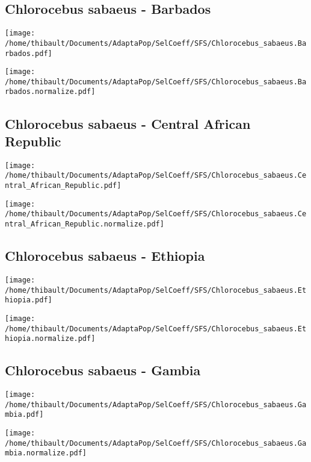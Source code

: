 \subsection{Chlorocebus sabaeus - Barbados} 
 
\begin{minipage}{0.49\linewidth} 
\texttt{[image: /home/thibault/Documents/AdaptaPop/SelCoeff/SFS/Chlorocebus\_sabaeus.Barbados.pdf]} 
\end{minipage}
\begin{minipage}{0.49\linewidth}
\texttt{[image: /home/thibault/Documents/AdaptaPop/SelCoeff/SFS/Chlorocebus\_sabaeus.Barbados.normalize.pdf]} 
\end{minipage}
\subsection{Chlorocebus sabaeus - Central African Republic} 
 
\begin{minipage}{0.49\linewidth} 
\texttt{[image: /home/thibault/Documents/AdaptaPop/SelCoeff/SFS/Chlorocebus\_sabaeus.Central\_African\_Republic.pdf]} 
\end{minipage}
\begin{minipage}{0.49\linewidth}
\texttt{[image: /home/thibault/Documents/AdaptaPop/SelCoeff/SFS/Chlorocebus\_sabaeus.Central\_African\_Republic.normalize.pdf]} 
\end{minipage}
\subsection{Chlorocebus sabaeus - Ethiopia} 
 
\begin{minipage}{0.49\linewidth} 
\texttt{[image: /home/thibault/Documents/AdaptaPop/SelCoeff/SFS/Chlorocebus\_sabaeus.Ethiopia.pdf]} 
\end{minipage}
\begin{minipage}{0.49\linewidth}
\texttt{[image: /home/thibault/Documents/AdaptaPop/SelCoeff/SFS/Chlorocebus\_sabaeus.Ethiopia.normalize.pdf]} 
\end{minipage}
\subsection{Chlorocebus sabaeus - Gambia} 
 
\begin{minipage}{0.49\linewidth} 
\texttt{[image: /home/thibault/Documents/AdaptaPop/SelCoeff/SFS/Chlorocebus\_sabaeus.Gambia.pdf]} 
\end{minipage}
\begin{minipage}{0.49\linewidth}
\texttt{[image: /home/thibault/Documents/AdaptaPop/SelCoeff/SFS/Chlorocebus\_sabaeus.Gambia.normalize.pdf]} 
\end{minipage}
